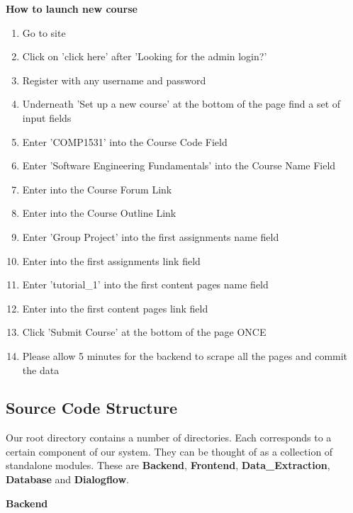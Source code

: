 \textbf{How to launch new course}
\begin{enumerate}
	\item {Go to site}
	\item {Click on 'click here' after 'Looking for the admin login?'}
	\item {Register with any username and password}
	\item {Underneath 'Set up a new course' at the bottom of the page find a set of input fields}
	\item {Enter 'COMP1531' into the Course Code Field}
	\item {Enter 'Software Engineering Fundamentals' into the Course Name Field}
	\item {Enter  into the Course Forum Link}
	\item {Enter  into the Course Outline Link}
	\item {Enter 'Group Project' into the first assignments name field}
	\item {Enter  into the first assignments link field}
	\item {Enter 'tutorial_1' into the first content pages name field}
	\item {Enter  into the first content pages link field}	
	\item {Click 'Submit Course' at the bottom of the page ONCE}
	\item {Please allow 5 minutes for the backend to scrape all the pages and commit the data}
\end{enumerate}

\subsection{Source Code Structure}
Our root directory contains a number of directories. Each corresponds to a certain component of our system. They can be thought of as a collection of standalone modules. These are \textbf{Backend}, \textbf{Frontend}, \textbf{Data\_Extraction}, \textbf{Database} and \textbf{Dialogflow}.

\textbf{Backend}


